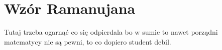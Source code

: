 \section{Wzór Ramanujana}

Tutaj trzeba ogarnąć co się odpierdala bo w sumie to nawet porządni matematycy nie są pewni, to co dopiero student debil.